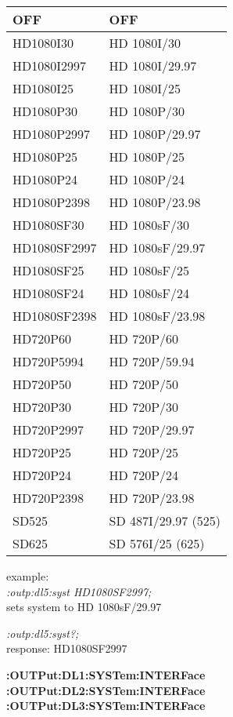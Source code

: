 \begin{tabular}{|l|l|}
\hline
OFF           &  OFF             \\ \hline
HD1080I30     &  HD 1080I/30     \\ \hline
HD1080I2997   &  HD 1080I/29.97  \\ \hline          
HD1080I25     &  HD 1080I/25     \\ \hline
HD1080P30     &  HD 1080P/30     \\ \hline
HD1080P2997   &  HD 1080P/29.97  \\ \hline
HD1080P25     &  HD 1080P/25     \\ \hline
HD1080P24     &  HD 1080P/24     \\ \hline
HD1080P2398   &  HD 1080P/23.98  \\ \hline
HD1080SF30    &  HD 1080sF/30    \\ \hline
HD1080SF2997  &  HD 1080sF/29.97 \\ \hline
HD1080SF25    &  HD 1080sF/25    \\ \hline
HD1080SF24    &  HD 1080sF/24    \\ \hline
HD1080SF2398  &  HD 1080sF/23.98 \\ \hline
HD720P60      &  HD 720P/60       \\ \hline
HD720P5994    &  HD 720P/59.94    \\ \hline
HD720P50      &  HD 720P/50       \\ \hline
HD720P30      &  HD 720P/30       \\ \hline
HD720P2997    &  HD 720P/29.97    \\ \hline
HD720P25      &  HD 720P/25       \\ \hline
HD720P24      &  HD 720P/24       \\ \hline
HD720P2398    &  HD 720P/23.98    \\ \hline
SD525         &  SD 487I/29.97 (525)\\ \hline
SD625         &  SD 576I/25 (625)\\ \hline
\end{tabular}

example:\\
\textit{:outp:dl5:syst HD1080SF2997;}\\
sets system to HD 1080sF/29.97

\textit{:outp:dl5:syst?;}\\
response: HD1080SF2997

\textbf{:OUTPut:DL1:SYSTem:INTERFace}\\
\textbf{:OUTPut:DL2:SYSTem:INTERFace}\\
\textbf{:OUTPut:DL3:SYSTem:INTERFace}\\

